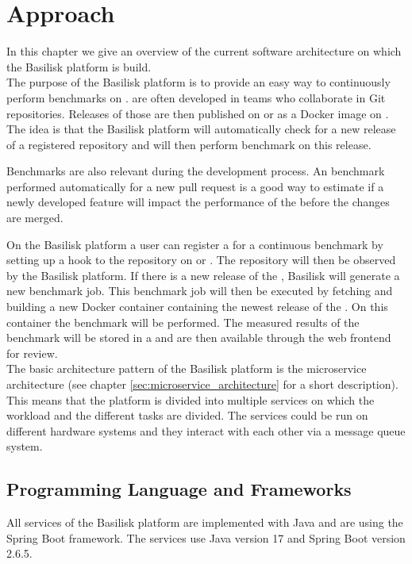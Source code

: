 \chapter{Approach}
\label{ch:approach}

In this chapter we give an overview of the current software architecture on which the Basilisk platform is build.
\\

The purpose of the Basilisk platform is to provide an easy way to continuously perform benchmarks on \tsp{}.
\tsp{} are often developed in teams who collaborate in Git repositories.
Releases of those \tsp{} are then published on \gh{} or as a Docker image on \dockh{}.
The idea is that the Basilisk platform will automatically check for a new release of a registered \ts{} repository and will then perform benchmark on this release.

Benchmarks are also relevant during the development process.
An benchmark performed automatically for \eg{} a new pull request is a good way to estimate if a newly developed feature will impact the performance of the \ts{} before the changes are merged.

On the Basilisk platform a user can register a \ts{} for a continuous benchmark by setting up a hook to the repository on \gh{} or \dockh{}.
The repository will then be observed by the Basilisk platform.
If there is a new release of the \ts{}, Basilisk will generate a new benchmark job.
This benchmark job will then be executed by fetching and building a new Docker container containing the newest release of the \ts{}.
On this container the benchmark will be performed.
The measured results of the benchmark will be stored in a \ts{} and are then available through the web frontend for review.
\\

The basic architecture pattern of the Basilisk platform is the microservice architecture (see chapter \ref{sec:microservice_architecture} for a short description). 
This means that the platform is divided into multiple services on which the workload and the different tasks are divided.
The services could be run on different hardware systems and they interact with each other via a message queue system.
\\

\section{Programming Language and Frameworks}
\label{sec:prog_lang_and_framework}
All services of the Basilisk platform are implemented with Java and are using the Spring Boot framework.
The services use Java version 17 and Spring Boot version 2.6.5.

